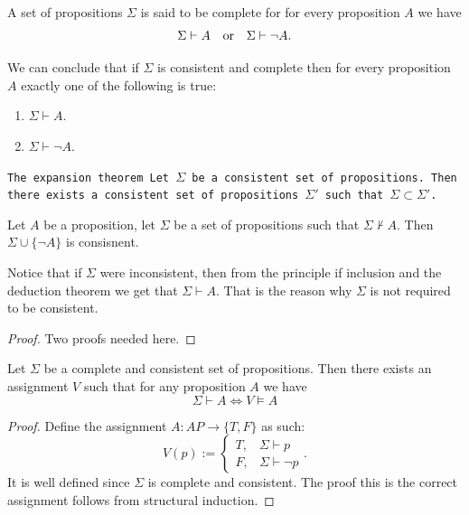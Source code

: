 \documentclass[11pt,a4paper]{article}
\DeclareRobustCommand{\models}{%
  \mathrel{\vDash}%
}
\begin{document}
\begin{definition}
  A set of propositions $\Sigma$ is said to be complete for for every
  proposition $A$ we have
  \[
    \Sigma \vdash A \quad \text{or} \quad \Sigma \vdash \neg A.
  \]
\end{definition}

We can conclude that if $\Sigma$ is consistent and complete then
for every proposition $A$ exactly one of the following is true:
\begin{enumerate}
  \item[(1)] $\Sigma \vdash A$.
  \item[(2)] $\Sigma \vdash \neg A$.
\end{enumerate}

\begin{theorem}\tt{The expansion theorem}
  Let $\Sigma$ be a consistent set of propositions.
  Then there exists a consistent set of propositions $\Sigma'$ such
  that $\Sigma \subset \Sigma'$.
\end{theorem}
\begin{lemma}
  Let $A$ be a proposition, let $\Sigma$ be a set of propositions such
  that $\Sigma \nvdash A$. Then $\Sigma \cup \{\neg A\}$ is consisnent.
\end{lemma}
\begin{remark}
  Notice that if $\Sigma$ were inconsistent, then from the principle
  if inclusion and the deduction theorem we get that $\Sigma \vdash A$.
  That is the reason why $\Sigma$ is not required to be consistent.
\end{remark}

\begin{proof}
  Two proofs needed here.
\end{proof}

\begin{lemma}
  Let $\Sigma$ be a complete and consistent set of propositions.
  Then there exists an assignment $V$ such that for any proposition
  $A$ we have
  \[
    \Sigma \vdash A \iff
    V \models A
  \]
\end{lemma}
\begin{proof}
  Define the assignment $A \colon AP \to \{T,F\}$ as such:
  \[
    V(p) :=
    \begin{cases}
      T, &\Sigma \vdash p \\
      F, &\Sigma \vdash \neg p
    \end{cases}.
  \]
  It is well defined since $\Sigma$ is complete and consistent.
  The proof this is the correct assignment follows from structural
  induction.
\end{proof}
\end{document}
